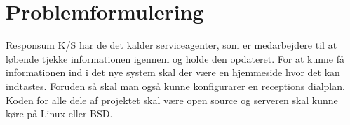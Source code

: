 \section{Problemformulering}
Responsum K/S har de det kalder serviceagenter, som er medarbejdere til at løbende tjekke informationen igennem og holde den opdateret. For at kunne få informationen ind i det nye system skal der være en hjemmeside hvor det kan indtastes. Foruden så skal man også kunne konfigurarer en receptions dialplan. Koden for alle dele af projektet skal være open source og serveren skal kunne køre på Linux eller BSD.


